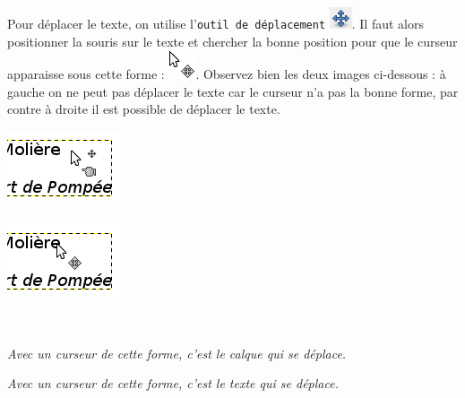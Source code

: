 
Pour déplacer le texte, on utilise l'\texttt{outil de déplacement} \includegraphics[width=.6cm]{./images/image02/iconeDeplace}. Il faut alors positionner la souris sur le texte et chercher la bonne position pour que le curseur apparaisse sous cette forme : \includegraphics[width=.6cm]{./images/image02/iconeTexteBouge}. Observez bien les deux images ci-dessous : à gauche on ne peut pas déplacer le texte car le curseur n'a pas la bonne forme, par contre à droite il est possible de déplacer le texte.


\begin{minipage}[c]{.46\textwidth}
\centering%
\includegraphics[angle=0,width=.4\textwidth]{./images/image02/TexteCurseurBougePas}
\end{minipage}\hfill%
\begin{minipage}[c]{.46\textwidth}
\centering%
\includegraphics[angle=0,width=.4\textwidth]{./images/image02/TexteCurseurBouge}
\end{minipage}\\[12pt]
\begin{minipage}[c]{.46\textwidth}
{\small \emph{Avec un curseur de cette forme, c'est le calque qui se déplace.}}
\end{minipage}\hfill%
\begin{minipage}[c]{.46\textwidth}
{\small \emph{Avec un curseur de cette forme, c'est le texte qui se déplace.}}
\end{minipage}

